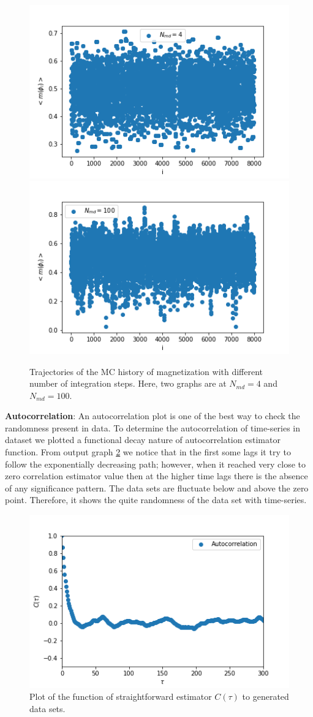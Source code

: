 \documentclass[11pt, a4paper, DIV=12]{scrartcl}
\begin{document}
\begin{figure}[H]
		\centering
\includegraphics[width=0.6\linewidth]{comparison_magnitization_4.png}\includegraphics[width=0.6\linewidth]{comparison_magnitization_100.png}
\caption{Trajectories of the MC history of magnetization with different number of integration steps. Here, two graphs are at $ N_{md}=4$ and $ N_{md}=100$.}
	\label{fig:comperision_4_100}
\end{figure}

	
\textbf{Autocorrelation}: An autocorrelation plot is one of the best way to check the randomness present in data. To determine the autocorrelation of time-series in dataset we plotted a functional decay nature of autocorrelation estimator function. From output graph \ref{fig:autocorrelation} we notice that in the first some lags it try to follow the exponentially decreasing path; however, when it reached very close to zero correlation estimator value then at the higher time lags there is the absence of any significance pattern. The data sets are fluctuate below and above the zero point. Therefore, it shows the quite randomness of the data set with time-series.
	
	\begin{figure}[H]
		\centering
		\includegraphics[width=0.6\linewidth]{autokorrelation.png}
		\caption{Plot of the function of straightforward estimator $ C(\tau) $ to generated data sets.}
		\label{fig:autocorrelation}
	\end{figure}
	
\end{document}
